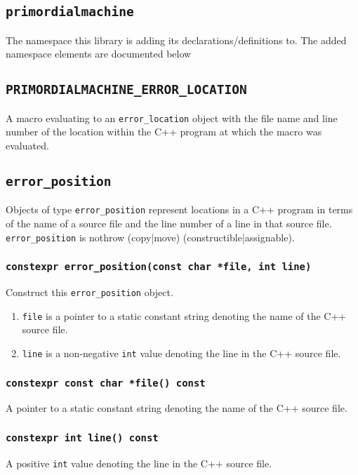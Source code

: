 \documentclass[oneside]{article}
\begin{document}
\subsection{\texttt{primordialmachine}}
The namespace this library is adding its declarations/definitions to.
The added namespace elements are documented below

\subsection{\texttt{PRIMORDIALMACHINE\_ERROR\_LOCATION}}
A macro evaluating to an \texttt{error\_location} object with the file name and line number of the
location within the C++ program at which the macro was evaluated.

\subsection{\texttt{error\_position}}
Objects of type \texttt{error\_position} represent locations in a C++ program in terms of the   name
of a source file and the line number of a line in that source file. \texttt{error\_position}      is
nothrow (copy|move) (constructible|assignable).

\subsubsection{\texttt{constexpr error\_position(const char *file, int line)}}
Construct this \texttt{error\_position} object.
\begin{enumerate}
   \item\texttt{file} is a pointer to a static constant string denoting the name of the C++ source file.
   \item\texttt{line} is a non-negative \texttt{int} value denoting the line in the C++ source file.
\end{enumerate}

\subsubsection{\texttt{constexpr const char *file() const}}
A pointer to a static constant string denoting the name of the C++ source file.

\subsubsection{\texttt{constexpr int line() const}}
A positive \texttt{int} value denoting the line in the C++ source file.
\end{document}

